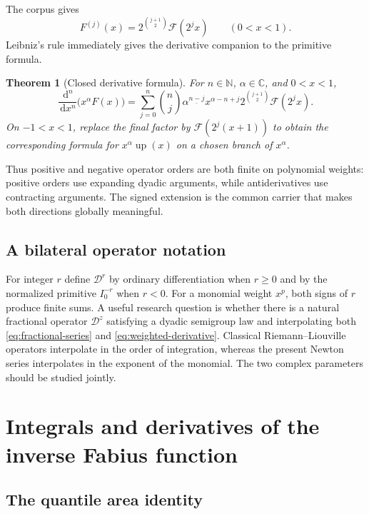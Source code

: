 \documentclass[11pt,oneside]{article}
\numberwithin{equation}{section}
\newtheorem{theorem}{Theorem}[section]
\theoremstyle{definition}
\theoremstyle{remark}
\newcommand{\C}{\mathbb C}
\newcommand{\N}{\mathbb N}
\newcommand{\Up}{\operatorname{up}}
\newcommand{\dd}{\,\mathrm d}
\newcommand{\fall}[2]{#1^{\underline{#2}}}
\begin{document}
The corpus gives
\begin{equation}
 F^{(j)}(x)=2^{\binom{j+1}{2}}\mathcal F(2^jx)\qquad(0<x<1).
 \label{eq:F-derivative-ladder}
\end{equation}
Leibniz's rule immediately gives the derivative companion to the primitive formula.

\begin{theorem}[Closed derivative formula]
\label{thm:weighted-derivative}
For $n\in\N$, $\alpha\in\C$, and $0<x<1$,
\begin{equation}
 \boxed{
 \frac{\dd^n}{\dd x^n}\bigl(x^\alpha F(x)\bigr)
 =\sum_{j=0}^{n}\binom nj\fall\alpha{n-j}
 x^{\alpha-n+j}2^{\binom{j+1}{2}}\mathcal F(2^jx).}
 \label{eq:weighted-derivative}
\end{equation}
On $-1<x<1$, replace the final factor by
$\mathcal F(2^j(x+1))$ to obtain the corresponding formula for $x^\alpha\Up(x)$ on a chosen
branch of $x^\alpha$.
\end{theorem}

Thus positive and negative operator orders are both finite on polynomial weights: positive
orders use expanding dyadic arguments, while antiderivatives use contracting arguments.  The
signed extension is the common carrier that makes both directions globally meaningful.

\subsection{A bilateral operator notation}

For integer $r$ define $\mathscr D^r$ by ordinary differentiation when $r\ge0$ and by the
normalized primitive $I_0^{-r}$ when $r<0$.  For a monomial weight $x^p$, both signs of $r$
produce finite sums.  A useful research question is whether there is a natural fractional
operator $\mathscr D^z$ satisfying a dyadic semigroup law and interpolating both
\eqref{eq:fractional-series} and \eqref{eq:weighted-derivative}.  Classical
Riemann--Liouville operators interpolate in the order of integration, whereas the present
Newton series interpolates in the exponent of the monomial.  The two complex parameters
should be studied jointly.

\section{Integrals and derivatives of the inverse Fabius function}
\label{sec:inverse}

\subsection{The quantile area identity}
\end{document}

